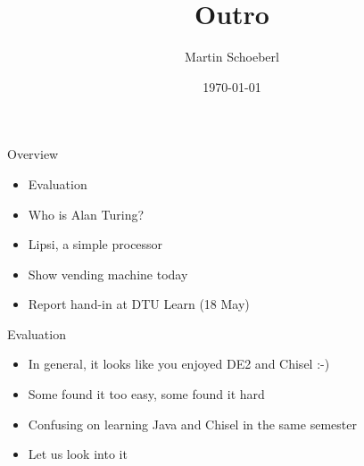 

\newif\ifbook


\title{Outro}
\author{Martin Schoeberl}
\date{\today}



\begin{frame}
\titlepage
\end{frame}


\begin{frame}[fragile]{Overview}
\begin{itemize}
\item Evaluation
\item Who is Alan Turing?
\item Lipsi, a simple processor
\item Show vending machine today
\item Report hand-in at DTU Learn (18 May)
\end{itemize}
\end{frame}




\begin{frame}[fragile]{Evaluation}
\begin{itemize}
\item In general, it looks like you enjoyed DE2 and Chisel :-)
\item Some found it too easy, some found it hard
\item Confusing on learning Java and Chisel in the same semester
\item Let us look into it
\end{itemize}
\end{frame}

